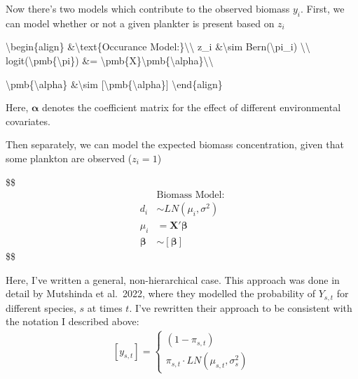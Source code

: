 \documentclass[
  letterpaper,
  DIV=11,
  numbers=noendperiod]{scrartcl}
\newenvironment{Shaded}{\begin{snugshade}}{\end{snugshade}}
\newcommand{\NormalTok}[1]{\textcolor[rgb]{0.00,0.23,0.31}{#1}}
\begin{document}
Now there's two models which contribute to the observed biomass \(y_i\).
First, we can model whether or not a given plankter is present based on
\(z_i\)

\begin{Shaded}
\begin{Highlighting}[]

\NormalTok{\textbackslash{}begin\{align\}}
\NormalTok{    \&\textbackslash{}text\{Occurance Model:\}\textbackslash{}\textbackslash{}}
\NormalTok{    z\_i \&\textbackslash{}sim Bern(\textbackslash{}pi\_i) \textbackslash{}\textbackslash{} }
\NormalTok{    logit(\textbackslash{}pmb\{\textbackslash{}pi\}) \&= \textbackslash{}pmb\{X\}\textquotesingle{}\textbackslash{}pmb\{\textbackslash{}alpha\}\textbackslash{}\textbackslash{}}
    
\NormalTok{    \textbackslash{}pmb\{\textbackslash{}alpha\} \&\textbackslash{}sim [\textbackslash{}pmb\{\textbackslash{}alpha\}]}
\NormalTok{\textbackslash{}end\{align\}}
\end{Highlighting}
\end{Shaded}

Here, \(\pmb{\alpha}\) denotes the coefficient matrix for the effect of
different environmental covariates.

Then separately, we can model the expected biomass concentration, given
that some plankton are observed (\(z_i = 1\))

\$\$ \begin{align}
    &\text{Biomass Model:}\\
    d_i &\sim LN(\mu_i, \sigma^2) \\ 
    \mu_i &= \pmb{X}'\pmb{\beta}\\
    
    \pmb{\beta} &\sim [\pmb{\beta}]
\end{align} \$\$

Here, I've written a general, non-hierarchical case. This approach was
done in detail by Mutshinda et al.~2022, where they modelled the
probability of \(Y_{s,t}\) for different species, \(s\) at times \(t\).
I've rewritten their approach to be consistent with the notation I
described above: \[
\begin{align}
    [y_{s,t}] = \left\{ 
        \begin{array}{l}
            (1 - \pi_{s,t})\\
            \pi_{s,t} \cdot LN(\mu_{s,t}, \sigma^2_s) 
        \end{array} \right.
\end{align}
\]
\end{document}
